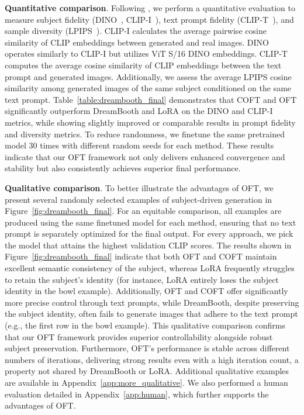 \textbf{Quantitative comparison}. Following \cite{ruiz2023dreambooth}, we perform a quantitative evaluation to measure subject fidelity (DINO~\cite{caron2021emerging}, CLIP-I~\cite{radford2021learning}), text prompt fidelity (CLIP-T~\cite{radford2021learning}), and sample diversity (LPIPS~\cite{zhang2018unreasonable}). CLIP-I calculates the average pairwise cosine similarity of CLIP embeddings between generated and real images. DINO operates similarly to CLIP-I but utilizes ViT S/16 DINO embeddings. CLIP-T computes the average cosine similarity of CLIP embeddings between the text prompt and generated images. Additionally, we assess the average LPIPS cosine similarity among generated images of the same subject conditioned on the same text prompt. Table~\ref{table:dreambooth_final} demonstrates that COFT and OFT significantly outperform DreamBooth and LoRA on the DINO and CLIP-I metrics, while showing slightly improved or comparable results in prompt fidelity and diversity metrics. To reduce randomness, we finetune the same pretrained model 30 times with different random seeds for each method. These results indicate that our OFT framework not only delivers enhanced convergence and stability but also consistently achieves superior final performance.

\textbf{Qualitative comparison}. To better illustrate the advantages of OFT, we present several randomly selected examples of subject-driven generation in Figure~\ref{fig:dreambooth_final}. For an equitable comparison, all examples are produced using the same finetuned model for each method, ensuring that no text prompt is separately optimized for the final output. For every approach, we pick the model that attains the highest validation CLIP scores. The results shown in Figure~\ref{fig:dreambooth_final} indicate that both OFT and COFT maintain excellent semantic consistency of the subject, whereas LoRA frequently struggles to retain the subject's identity (for instance, LoRA entirely loses the subject identity in the bowl example). Additionally, OFT and COFT offer significantly more precise control through text prompts, while DreamBooth, despite preserving the subject identity, often fails to generate images that adhere to the text prompt (e.g., the first row in the bowl example). This qualitative comparison confirms that our OFT framework provides superior controllability alongside robust subject preservation. Furthermore, OFT's performance is stable across different numbers of iterations, delivering strong results even with a high iteration count, a property not shared by DreamBooth or LoRA. Additional qualitative examples are available in Appendix~\ref{app:more_qualitative}. We also performed a human evaluation detailed in Appendix~\ref{app:human}, which further supports the advantages of OFT.

